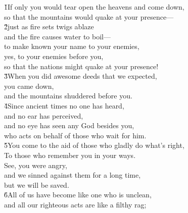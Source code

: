 \begin{poetry}
\poeml {}
\v{1}If only you would tear open the heavens and come down, \\
\poemll    so that the mountains would quake at your presence--- \\
\poeml \v{2}just as fire sets twigs ablaze \\
\poemll    and the fire causes water to boil--- \\
\poeml to make known your name to your enemies, \\
\poemll    yes, to your enemies before you, \\
\poemlll       so that the nations might quake at your presence! \\
\poeml \v{3}When you did awesome deeds that we expected, \\
\poemll    you came down, \\
\poemlll       and the mountains shuddered before you. \\
\poeml \v{4}Since ancient times no one has heard, \\
\poemll    and no ear has perceived, \\
\poeml and no eye has seen any God besides you, \\
\poemll    who acts on behalf of those who wait for him. \\
\poeml \v{5}You come to the aid of those who gladly do what's right, \\
\poemll    To those who remember you in your ways. \\
\poeml See, you were angry, \\
\poemll    and we sinned against them for a long time, \\
\poemlll       but we will be saved. \\
\poeml \v{6}All of us have become like one who is unclean, \\
\poemll    and all our righteous acts are like a filthy rag; \\

\end{poetry}
